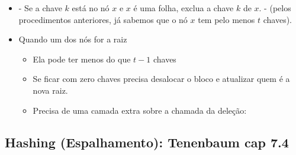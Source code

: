 \documentclass[a4paper, 12pt]{article}
\begin{document}
\begin{itemize}
\item {} - Se a chave $k$ está no nó $x$ e $x$ é uma folha, exclua a chave $k$ de $x$. - (pelos procedimentos anteriores, já sabemos que o nó $x$ tem pelo menos $t$ chaves).

\item {} Quando um dos nós for a raiz
\begin{itemize}
\item Ela pode ter menos do que $t-1$ chaves
\item Se ficar com zero chaves precisa desalocar o bloco e atualizar quem é a nova raiz.
\item Precisa de uma camada extra sobre a chamada da deleção:

\begin{algorithmic}[1]
	\State \Return
\Else 
\EndIf
{}
\EndIf
\end{algorithmic}


\end{itemize}

\end{itemize}



\subsection{Hashing (Espalhamento): Tenenbaum cap 7.4} 
\end{document}
